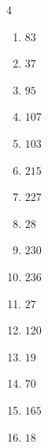 \begin{multicols}{4}
\begin{enumerate}
  \item $83$


  \item $37$


  \item $95$


  \item $107$


  \item $103$


  \item $215$


  \item $227$


  \item $28$


  \item $230$


  \item $236$


  \item $27$


\columnbreak %

  \item $120$


  \item $19$


  \item $70$


  \item $165$


  \item $18$


\end{enumerate}
\end{multicols}
